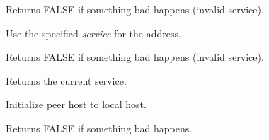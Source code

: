 Returns FALSE if something bad happens (invalid service).

%
%



Use the specified {\it service} for the address.


Returns FALSE if something bad happens (invalid service).

%
%



Returns the current service.

%
%



Initialize peer host to local host.


Returns FALSE if something bad happens.

